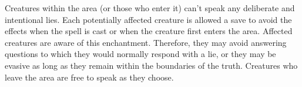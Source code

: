 \spelldur{\durmed}
\spelleffect Creatures within the area (or those who enter it) can't speak any deliberate and intentional lies. Each potentially affected creature is allowed a save to avoid the effects when the spell is cast or when the creature first enters the area. Affected creatures are aware of this enchantment. Therefore, they may avoid answering questions to which they would normally respond with a lie, or they may be evasive as long as they remain within the boundaries of the truth. Creatures who leave the area are free to speak as they choose.
